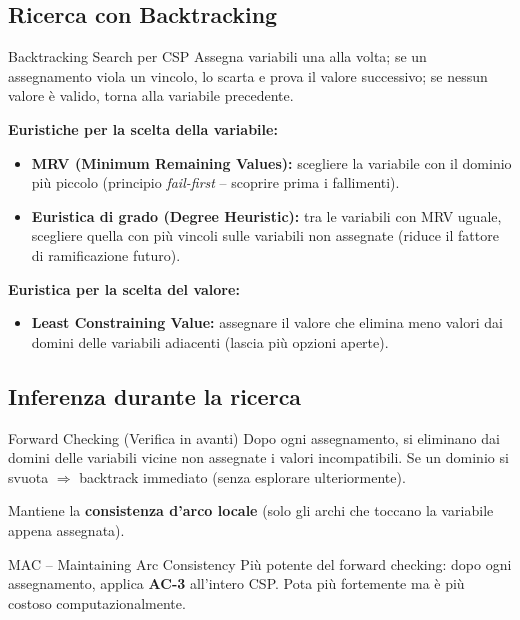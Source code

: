 \documentclass[12pt,a4paper]{article}
\begin{document}
\subsection{Ricerca con Backtracking}

\begin{thmbox}{Backtracking Search per CSP}
Assegna variabili una alla volta; se un assegnamento viola un vincolo, lo scarta e prova il valore successivo; se nessun valore è valido, torna alla variabile precedente.

\textbf{Euristiche per la scelta della variabile:}
\begin{itemize}[noitemsep]
  \item \textbf{MRV (Minimum Remaining Values):} scegliere la variabile con il dominio più piccolo (principio \emph{fail-first} -- scoprire prima i fallimenti).
  \item \textbf{Euristica di grado (Degree Heuristic):} tra le variabili con MRV uguale, scegliere quella con più vincoli sulle variabili non assegnate (riduce il fattore di ramificazione futuro).
\end{itemize}

\textbf{Euristica per la scelta del valore:}
\begin{itemize}[noitemsep]
  \item \textbf{Least Constraining Value:} assegnare il valore che elimina meno valori dai domini delle variabili adiacenti (lascia più opzioni aperte).
\end{itemize}
\end{thmbox}

\subsection{Inferenza durante la ricerca}

\begin{defbox}{Forward Checking (Verifica in avanti)}
Dopo ogni assegnamento, si eliminano dai domini delle variabili vicine non assegnate i valori incompatibili. Se un dominio si svuota $\Rightarrow$ backtrack immediato (senza esplorare ulteriormente).

Mantiene la \textbf{consistenza d'arco locale} (solo gli archi che toccano la variabile appena assegnata).
\end{defbox}

\begin{defbox}{MAC -- Maintaining Arc Consistency}
Più potente del forward checking: dopo ogni assegnamento, applica \textbf{AC-3} all'intero CSP. Pota più fortemente ma è più costoso computazionalmente.
\end{defbox}
\end{document}
